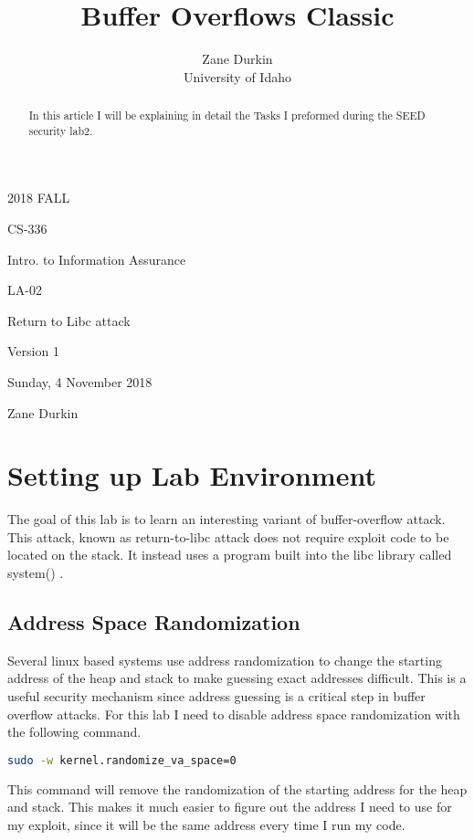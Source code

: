 \documentclass[14pt]{extarticle}
\begin{document}
\title{Buffer Overflows Classic}

\author{Zane Durkin\\
    University of Idaho}
\begin{description}[leftmargin=!, labelwidth=\widthof{\bfseries Author(s) Name(s)}]
\item [Year and Semester] 2018 FALL
\item [Course Number] CS-336
\item [Course Title] Intro. to Information Assurance
\item [Work Number] LA-02
\item [Work Name] Return to Libc attack
\item [Work Version] Version 1
\item [Long Date] Sunday, 4 November 2018
\item [Author(s) Name(s)] Zane Durkin
\end{description}
\begin{abstract}
In this article I will be explaining in detail the Tasks I preformed during the SEED security lab2.
\end{abstract}

\setcounter{section}{-1}
\section{Setting up Lab Environment}
The goal of this lab is to learn an interesting variant of buffer-overflow attack. This attack, known as return-to-libc attack does not require exploit code to be located on the stack. It instead uses a program built into the libc library called system()
\cite{seed-retlibc}.

\subsection{Address Space Randomization}
Several linux based systems use address randomization to change the starting address of the heap and stack to make guessing exact addresses difficult. This is a useful security mechanism since address guessing is a critical step in buffer overflow attacks. For this lab I need to disable address space randomization with the following command\cite{seed-retlibc}.
\begin{lstlisting}[language=sh]
sudo -w kernel.randomize_va_space=0
\end{lstlisting}
This command will remove the randomization of the starting address for the heap and stack. This makes it much easier to figure out the address I need to use for my exploit, since it will be the same address every time I run my code.
\end{document}

